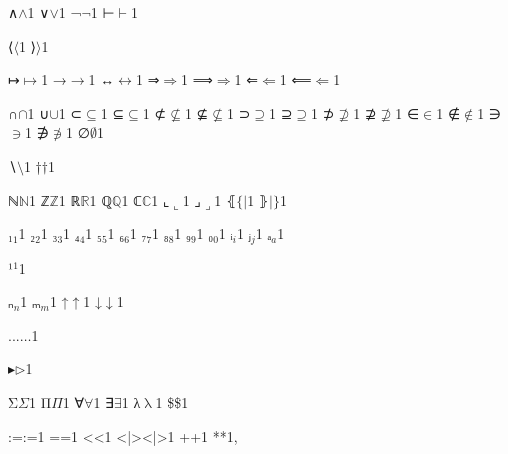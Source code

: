 {{∧}{{\ensuremath{\wedge}}}1
{∨}{{\ensuremath{\vee}}}1
{¬}{{\ensuremath{\neg}}}1
{⊢}{{\ensuremath{\vdash}}}1

{⟨}{{\ensuremath{\langle}}}1
{⟩}{{\ensuremath{\rangle}}}1

{↦}{{\ensuremath{\mapsto}}}1
{→}{{\ensuremath{\rightarrow}}}1
{↔}{{\ensuremath{\leftrightarrow}}}1
{⇒}{{\ensuremath{\Rightarrow}}}1
{⟹}{{\ensuremath{\Longrightarrow}}}1
{⇐}{{\ensuremath{\Leftarrow}}}1
{⟸}{{\ensuremath{\Longleftarrow}}}1

{∩}{{\ensuremath{\cap}}}1
{∪}{{\ensuremath{\cup}}}1
{⊂}{{\ensuremath{\subseteq}}}1
{⊆}{{\ensuremath{\subseteq}}}1
{⊄}{{\ensuremath{\nsubseteq}}}1
{⊈}{{\ensuremath{\nsubseteq}}}1
{⊃}{{\ensuremath{\supseteq}}}1
{⊇}{{\ensuremath{\supseteq}}}1
{⊅}{{\ensuremath{\nsupseteq}}}1
{⊉}{{\ensuremath{\nsupseteq}}}1
{∈}{{\ensuremath{\in}}}1
{∉}{{\ensuremath{\notin}}}1
{∋}{{\ensuremath{\ni}}}1
{∌}{{\ensuremath{\notni}}}1
{∅}{{\ensuremath{\emptyset}}}1

{∖}{{\ensuremath{\setminus}}}1
{†}{{\ensuremath{\dag}}}1

{ℕ}{{\ensuremath{\mathbb{N}}}}1
{ℤ}{{\ensuremath{\mathbb{Z}}}}1
{ℝ}{{\ensuremath{\mathbb{R}}}}1
{ℚ}{{\ensuremath{\mathbb{Q}}}}1
{ℂ}{{\ensuremath{\mathbb{C}}}}1
{⌞}{{\ensuremath{\llcorner}}}1
{⌟}{{\ensuremath{\lrcorner}}}1
{⦃}{{\ensuremath{\{\!|}}}1
{⦄}{{\ensuremath{|\!\}}}}1

{₁}{{\ensuremath{_1}}}1
{₂}{{\ensuremath{_2}}}1
{₃}{{\ensuremath{_3}}}1
{₄}{{\ensuremath{_4}}}1
{₅}{{\ensuremath{_5}}}1
{₆}{{\ensuremath{_6}}}1
{₇}{{\ensuremath{_7}}}1
{₈}{{\ensuremath{_8}}}1
{₉}{{\ensuremath{_9}}}1
{₀}{{\ensuremath{_0}}}1
{ᵢ}{{\ensuremath{_i}}}1
{ⱼ}{{\ensuremath{_j}}}1
{ₐ}{{\ensuremath{_a}}}1

{¹}{{\ensuremath{^1}}}1

{ₙ}{{\ensuremath{_n}}}1
{ₘ}{{\ensuremath{_m}}}1
{↑}{{\ensuremath{\uparrow}}}1
{↓}{{\ensuremath{\downarrow}}}1

{...}{{\ensuremath{\ldots}}}1

{▸}{{\ensuremath{\triangleright}}}1

{Σ}{{\color{symbolcolor}\ensuremath{\Sigma}}}1
{Π}{{\color{symbolcolor}\ensuremath{\Pi}}}1
{∀}{{\color{symbolcolor}\ensuremath{\forall}}}1
{∃}{{\color{symbolcolor}\ensuremath{\exists}}}1
{λ}{{\color{symbolcolor}\ensuremath{\mathrm{\uplambda}}}}1
{\$}{{\color{symbolcolor}\$}}1

{:=}{{\color{symbolcolor}:=}}1
{=}{{\color{symbolcolor}=}}1
{<}{{\color{symbolcolor}<}}1
{<|>}{{\color{symbolcolor}<|>}}1
{+}{{\color{symbolcolor}+}}1
{*}{{\color{symbolcolor}*}}1,

}
